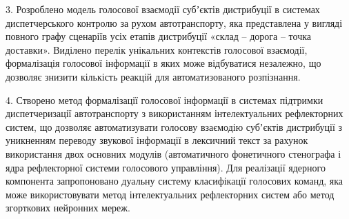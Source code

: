 3. Розроблено модель голосової взаємодії субʼєктів дистрибуції в системах диспетчерського контролю за рухом автотранспорту, яка представлена у вигляді повного графу сценаріїв усіх етапів дистрибуції «склад – дорога – точка доставки». Виділено перелік унікальних контекстів голосової взаємодії, формалізація голосової інформації в яких може відбуватися незалежно, що дозволяє знизити кількість реакцій для автоматизованого розпізнання.


4. Створено метод формалізації голосової інформації в системах підтримки диспетчеризації автотранспорту з використанням інтелектуальних рефлекторних систем, що дозволяє автоматизувати голосову взаємодію субʼєктів дистрибуції з уникненням переводу звукової інформації в лексичний текст за рахунок використання двох основних модулів (автоматичного фонетичного стенографа і ядра рефлекторної системи голосового управління). Для реалізації ядерного компонента запропоновано дуальну систему класифікації голосових команд, яка може використовувати метод інтелектуальних рефлекторних систем або метод згорткових нейронних мереж.


